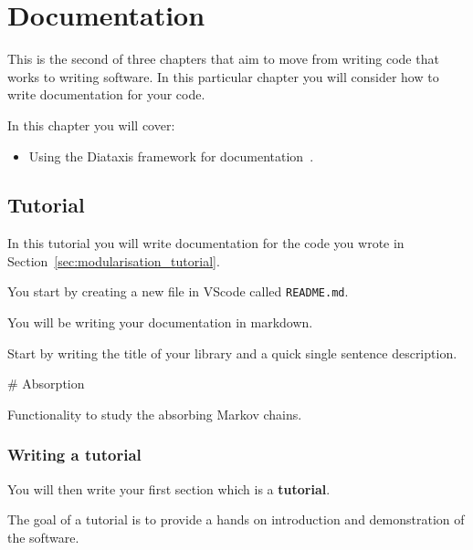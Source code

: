\chapter{Documentation}
\label{chp:documentation} 

This is the second of three chapters that aim to move from writing code
that works to writing software. In this particular chapter you will consider how
to write documentation for your code.

\begin{note}
In this chapter you will cover:
\begin{itemize}
\item 

Using the Diataxis framework for
documentation~\cite{Procida_Diataxis_documentation_framework}.

\end{itemize}
\end{note}




\section{Tutorial}
\label{sec:documentation_tutorial}

In this tutorial you will write documentation for the code
you wrote in Section~\ref{sec:modularisation_tutorial}.


You start by creating a new file in VScode called \texttt{README.md}.

\begin{note}
You will be writing your documentation in markdown.
\end{note}


Start by writing the title of your library and a quick single sentence
description.

\begin{md}
# Absorption

Functionality to study the absorbing Markov chains.
\end{md}


\subsection{Writing a tutorial}
\label{\detokenize{building-tools/06-documentation/tutorial/main:writing-a-tutorial}}

You will then write your first section which is a \textbf{tutorial}.

\begin{note}
The goal of a tutorial is to provide a hands on introduction and demonstration
of the software.
\end{note}

